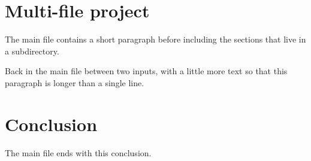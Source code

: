 \documentclass{article}
\begin{document}
\section*{Multi-file project}
The main file contains a short paragraph before including the
sections that live in a subdirectory.



Back in the main file between two inputs, with a little more text so
that this paragraph is longer than a single line.



\section*{Conclusion}
The main file ends with this conclusion.
\end{document}
